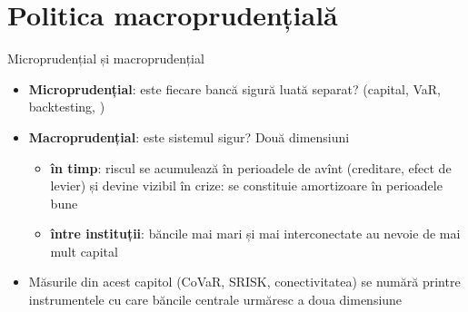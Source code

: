\section{Politica macroprudențială}

\begin{frame}{Microprudențial și macroprudențial}
\itemsize{\small}
\begin{itemize}
    \item \textbf{Microprudențial}: este fiecare bancă sigură luată separat? (capital, VaR, backtesting, )
    \item \textbf{Macroprudențial}: este sistemul sigur? Două dimensiuni
    \begin{itemize}
        \item \textbf{în timp}: riscul se acumulează în perioadele de avînt (creditare, efect de levier) și devine vizibil în crize: se constituie amortizoare în perioadele bune
        \item \textbf{între instituții}: băncile mai mari și mai interconectate au nevoie de mai mult capital
    \end{itemize}
    \item Măsurile din acest capitol (CoVaR, SRISK, conectivitatea) se numără printre instrumentele cu care băncile centrale urmăresc a doua dimensiune
\end{itemize}
\end{frame}

